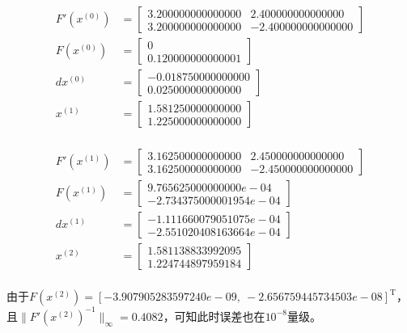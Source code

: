 \documentclass[UTF8,zihao=5]{ctexart}
\newcommand{\trans}[0]{^\mathrm{T}}
\begin{document}
$$
    \begin{aligned}
        F'(x^{(0)}) & =\begin{bmatrix}
            3.200000000000000&2.400000000000000\\
            3.200000000000000&-2.400000000000000
        \end{bmatrix} \\
        F(x^{(0)})  & =\begin{bmatrix}
            0\\0.120000000000001
        \end{bmatrix} \\
        dx^{(0)}    & =\begin{bmatrix}
            -0.018750000000000\\0.025000000000000
        \end{bmatrix} \\
        x^{(1)}     & =\begin{bmatrix}
            1.581250000000000\\1.225000000000000
        \end{bmatrix} \\
    \end{aligned}
$$

$$
    \begin{aligned}
        F'(x^{(1)}) & =\begin{bmatrix}
            3.162500000000000&2.450000000000000\\
            3.162500000000000&-2.450000000000000
        \end{bmatrix} \\
        F(x^{(1)})  & =\begin{bmatrix}
            9.765625000000000e-04\\-2.734375000001954e-04
        \end{bmatrix} \\
        dx^{(1)}    & =\begin{bmatrix}
            -1.111660079051075e-04\\-2.551020408163664e-04
        \end{bmatrix} \\
        x^{(2)}     & =\begin{bmatrix}
            1.581138833992095\\1.224744897959184
        \end{bmatrix} \\
    \end{aligned}
$$

由于$F(x^{(2)})=[-3.907905283597240e-09,\ -2.656759445734503e-08]\trans $，
且$\|F'(x^{(2)})^{-1}\|_\infty=0.4082$，可知此时误差也在$10^{-8}$量级。
\end{document}
